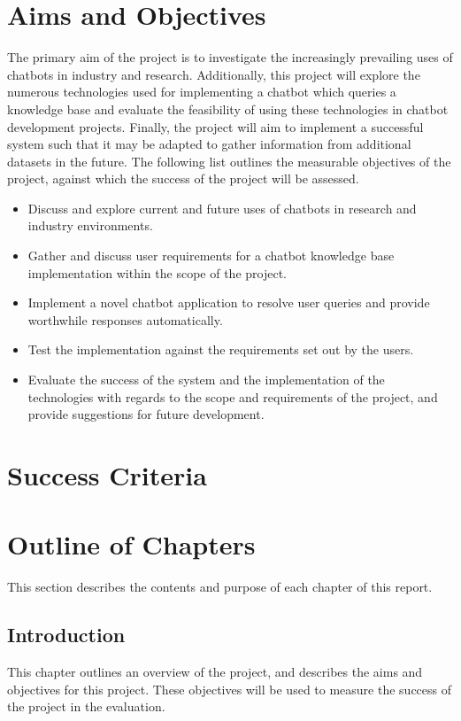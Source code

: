 \section{Aims and Objectives}
\label{sec:aims}
The primary aim of the project is to investigate the increasingly prevailing uses of chatbots in industry and research. Additionally, this project will explore the numerous technologies used for implementing a chatbot which queries a knowledge base and evaluate the feasibility of using these technologies in chatbot development projects. Finally, the project will aim to implement a successful system such that it may be adapted to gather information from additional datasets in the future. The following list outlines the measurable objectives of the project, against which the success of the project will be assessed.

\begin{itemize}
	\itemsep0em 
	\item Discuss and explore current and future uses of chatbots in research and industry environments.
	\item Gather and discuss user requirements for a chatbot knowledge base implementation within the scope of the project.
	\item Implement a novel chatbot application to resolve user queries and provide worthwhile responses automatically.
	\item Test the implementation against the requirements set out by the users.
	\item Evaluate the success of the system and the implementation of the technologies with regards to the scope and requirements of the project, and provide suggestions for future development.

\end{itemize}

\section{Success Criteria}

\newpage
\section{Outline of Chapters}
This section describes the contents and purpose of each chapter of this report.

\subsection*{Introduction}
This chapter outlines an overview of the project, and describes the aims and objectives for this project. These objectives will be used to measure the success of the project in the evaluation.

